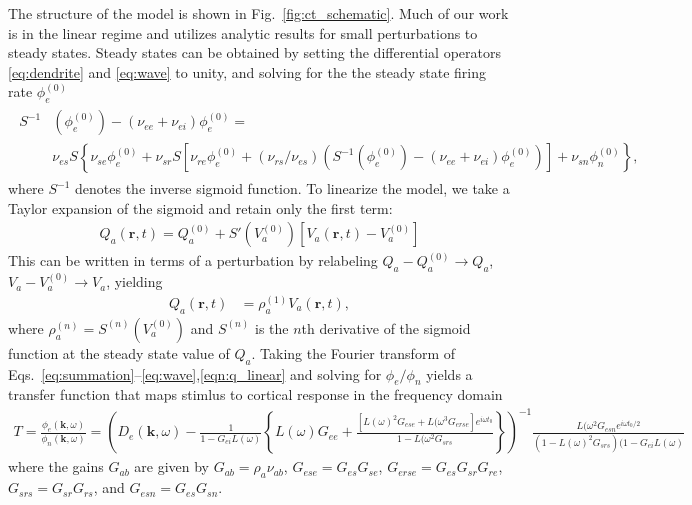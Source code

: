\documentclass[preprint,review,10pt,authoryear,letterpaper]{elsarticle}
\begin{document}
The structure of the model is shown in Fig.~\ref{fig:ct_schematic}. Much of our work is in the linear regime and utilizes analytic results for small perturbations to steady states. Steady states can be obtained by setting the differential operators \eqref{eq:dendrite} and \eqref{eq:wave} to unity, and solving for the the steady state firing rate $\phi_e^{(0)}$ \cite{Robinson:04aa}
\begin{align}
	\label{eqn:ve_root}
	\begin{split}
	S^{-1}&(\phi_e^{(0)})-(\nu_{ee}+\nu_{ei})\phi_e^{(0)} = \\ &\nu_{es}S\left\{\nu_{se}\phi_e^{(0)}+\nu_{sr}S\left[\nu_{re}\phi_e^{(0)}+(\nu_{rs}/\nu_{es})\left(S^{-1}(\phi_e^{(0)})-(\nu_{ee}+\nu_{ei})\phi_e^{(0)}\right)\right]+\nu_{sn}\phi_n^{(0)}\right\}, 
\end{split}
\end{align}
where $S^{-1}$ denotes the inverse sigmoid function. To linearize the model, we take a Taylor expansion of the sigmoid and retain only the first term:
\begin{align}
Q_a(\mathbf{r},t) = Q_a^{(0)} + S'\left(V_a^{(0)}\right) \left[V_a(\mathbf{r},t)-V_a^{(0)}\right]
\end{align}
This can be written in terms of a perturbation by relabeling $Q_a-Q_a^{(0)} \rightarrow Q_a $, $V_a-V_a^{(0)} \rightarrow V_a$, yielding
\begin{align}
\label{eqn:q_linear}
Q_a(\mathbf{r},t) &= \rho_a^{(1)} V_a(\mathbf{r},t),
\end{align}
where $\rho_a^{(n)} = S^{(n)}\left(V_a^{(0)}\right)$ and $S^{(n)}$ is the $n$th derivative of the sigmoid function at the steady state value of $Q_a$. Taking the Fourier transform of Eqs.~\ref{eq:summation}--\ref{eq:wave},\ref{eqn:q_linear} and solving for $\phi_e/\phi_n$ yields a transfer function that maps stimlus to cortical response in the frequency domain
\begin{align}
\label{eqn:transfer_unsimplified}
T = \frac{\phi_e(\mathbf{k},\omega)}{\phi_n(\mathbf{k},\omega)}  =  \left( D_{e}(\mathbf{k},\omega) - \frac{1}{1-G_{ei}L(\omega)} \left\lbrace L(\omega) G_{ee} + \frac{\left[ L(\omega)^2 G_{ese}  + L(\omega^3 G_{erse}\right]e^{i\omega t_0}}{1 - L(\omega^2 G_{srs}}  \right\rbrace \right)^{-1} \frac{L(\omega^2G_{esn}e^{i\omega t_0 /2}}{(1 - L(\omega)^2 G_{srs})(1-G_{ei}L(\omega)}
\end{align}
where the gains $G_{ab}$ are given by $G_{ab}=\rho_a\nu_{ab}$, $G_{ese} = G_{es}G_{se}$, $G_{erse} = G_{es}G_{sr}G_{re}$, $G_{srs} = G_{sr}G_{rs}$, and $G_{esn} = G_{es}G_{sn}$.
\end{document}
